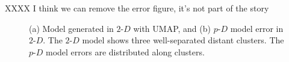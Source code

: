 \documentclass[
  12pt]{article}
\begin{document}
XXXX I think we can remove the error figure, it's not part of the story

\begin{figure}[H]


\caption{\label{fig-model-pbmc-author}(a) Model generated in
\(2\text{-}D\) with UMAP, and (b) \(p\text{-}D\) model error in
\(2\text{-}D\). The \(2\text{-}D\) model shows three well-separated
distant clusters. The \(p\text{-}D\) model errors are distributed along
clusters.}

\end{figure}%

\begin{figure}[H]


\end{figure}
\end{document}
